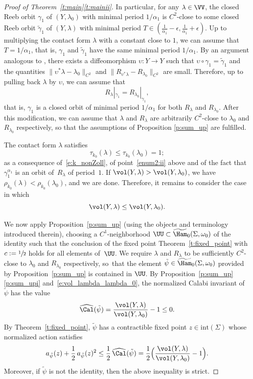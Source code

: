 \begin{proof}[Proof of Theorem~\ref{t:main}\eqref{t:mainii}]
In particular, for any $\lambda\in\VV$, the closed Reeb orbit $\gamma_1$ of $(Y,\lambda_0)$ with minimal period $1/\alpha_1$ is $C^2$-close to some closed Reeb orbit $\tilde\gamma_1$ of $(Y,\lambda)$ with minimal period $T\in(\tfrac1{\alpha_1}-\epsilon,\tfrac1{\alpha_1}+\epsilon)$. Up to multiplying the contact form $\lambda$ with a constant close to $1$, we can assume that $T=1/\alpha_1$, that is, $\gamma_1$ and $\tilde\gamma_1$ have the same minimal period $1/\alpha_1$. By an argument analogous to \cite[Prop.\,3.10]{Abbondandolo:2018fb}, there exists a diffeomorphism $\upsilon:Y\to Y$ such that $\upsilon\circ\gamma_1=\tilde\gamma_1$ and the quantities $\|\upsilon^*\lambda - \lambda_0\|_{C^2}$ and
$\|R_{\upsilon^*\lambda}-R_{\lambda_0}\|_{C^2}$ are small. Therefore, up to pulling back $\lambda$ by $\upsilon$, we can assume that
\[
R_\lambda|_{\gamma_1}=R_{\lambda_0}|_{\gamma_1},
\]
that is, $\gamma_1$ is a closed orbit of minimal period $1/\alpha_1$ for both $R_{\lambda}$ and $R_{\lambda_0}$. After this modification, we can assume that $\lambda$ and $R_{\lambda}$ are arbitrarily $C^2$-close to $\lambda_0$ and $R_{\lambda_0}$ respectively, so that the assumptions of Proposition \ref{p:sum_up} are fulfilled.

The contact form $\lambda$ satisfies
\[
\tau_{k_0}(\lambda)\leq \tau_{k_0}(\lambda_0)=1;
\]
as a consequence of~\eqref{e:k_nonZoll}, of point~\eqref{enum2:ii} above and of the fact that $\gamma_1^{\alpha_1}$ is an orbit of~$R_{\lambda}$ of period~$1$. If $\vol(Y,\lambda)>\vol(Y,\lambda_0)$, we have $\rho_{k_0}(\lambda)<\rho_{k_0}(\lambda_0)$, and we are done. Therefore, it remains to consider the case in which
\begin{equation}
\label{e:vol_lambda_lambda_0}
\vol(Y,\lambda)\leq\vol(Y,\lambda_0).
\end{equation}

We now apply Proposition~\ref{p:sum_up} (using the objects and terminology introduced therein), choosing a $C^1$-neighborhood $\UU\subset\widetilde{\Ham}_0(\Sigma,\omega_0)$ of the identity such that the conclusion of the fixed point Theorem~\ref{t:fixed_point} with $c:=\sfrac{1}{2}$ holds for all elements of~$\UU$. We require $\lambda$ and $R_{\lambda}$ to be sufficiently $C^2$-close to $\lambda_0$ and $R_{\lambda_0}$ respectively, so~that the element $\tilde\psi\in\widetilde{\Ham}_0(\Sigma,\omega_0)$ provided by Proposition~\ref{p:sum_up} is contained in $\UU$. By Proposition~\ref{p:sum_up}\eqref{p:sum_upi} and~\eqref{e:vol_lambda_lambda_0}, the normalized Calabi invariant of $\tilde\psi$ has the value
\[
\widehat{\Cal}(\tilde\psi)=\frac{\vol(Y,\lambda)}{\vol(Y,\lambda_0)} - 1 \leq0.
\]
By Theorem~\ref{t:fixed_point}, $\tilde\psi$ has a contractible fixed point $z\in \mathrm{int}(\Sigma)$ whose normalized action satisfies
\begin{equation}
\label{e:action_upper_bound}
a_{\tilde{\psi}}(z) + \frac{1}{2}\, a_{\tilde\psi}(z)^2
\leq \frac{1}{2} \, \widehat{\Cal}(\tilde\psi)
=
\frac12
\Bigl(\frac{\vol(Y,\lambda)}{\vol(Y,\lambda_0)}-1 \Bigr).
\end{equation}
Moreover, if $\tilde\psi$ is not the identity, then the above inequality is strict.


\end{proof}
